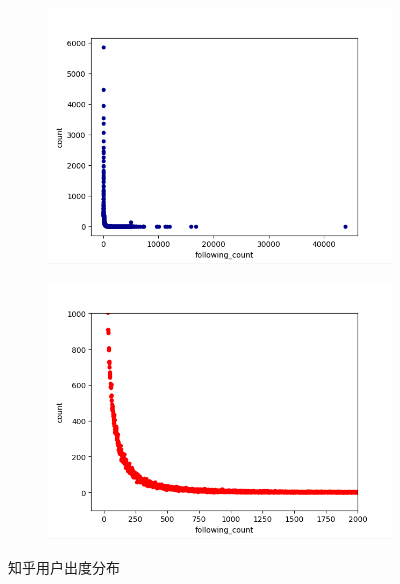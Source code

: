 \documentclass[bachelor,adobefonts]{jnuthesis}
\begin{document}
\begin{figure}[h!]
  \centering
  \begin{subfigure}[b]{0.49\linewidth}
    \includegraphics[width=\linewidth]{Wfollowing-1.png}
    \caption{}
  \end{subfigure}
  \begin{subfigure}[b]{0.49\linewidth}
    \includegraphics[width=\linewidth]{Wfollowing-2.png}
    \caption{}
  \end{subfigure}
  \caption{知乎用户出度分布}
\end{figure}
\end{document}
